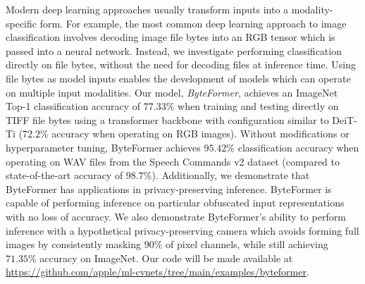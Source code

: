 Modern deep learning approaches usually transform inputs into a modality-specific form. For example, the most common deep learning approach to image classification involves decoding image file bytes into an RGB tensor which is passed into a neural network. Instead, we investigate performing classification directly on file bytes, without the need for decoding files at inference time. Using file bytes as model inputs enables the development of models which can operate on multiple input modalities. Our model, \emph{ByteFormer}, achieves an ImageNet Top-1 classification accuracy of $77.33\%$ when training and testing directly on TIFF file bytes using a transformer backbone with configuration similar to DeiT-Ti ($72.2\%$ accuracy when operating on RGB images). Without modifications or hyperparameter tuning, ByteFormer achieves $95.42\%$ classification accuracy when operating on WAV files from the Speech Commands v2 dataset (compared to state-of-the-art accuracy of $98.7\%$). Additionally, we demonstrate that ByteFormer has applications in privacy-preserving inference. ByteFormer is capable of performing inference on particular obfuscated input representations with no loss of accuracy. We also demonstrate ByteFormer's ability to perform inference with a hypothetical privacy-preserving camera which avoids forming full images by consistently masking $90\%$ of pixel channels, while still achieving $71.35\%$ accuracy on ImageNet. Our code will be made available at \url{https://github.com/apple/ml-cvnets/tree/main/examples/byteformer}.